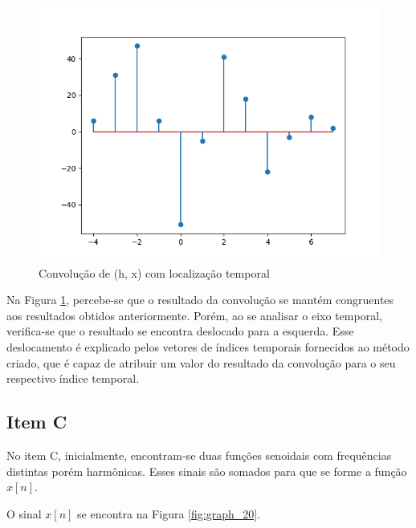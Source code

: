  \begin{figure}[!htb]
    \centering
    \includegraphics[width=\linewidth]{Imagens/fig19.png}
    \caption{Convolução de (h, x) com localização temporal}
    \label{fig:graph_19}
\end{figure}

 Na Figura \ref{fig:graph_19}, percebe-se que o resultado da convolução se mantém congruentes aos resultados obtidos anteriormente. Porém, ao se analisar o eixo temporal, verifica-se que o resultado se encontra deslocado para a esquerda. Esse deslocamento é explicado pelos vetores de índices temporais fornecidos ao método criado, que é capaz de atribuir um valor do resultado da convolução para o seu respectivo índice temporal. 

\subsection{Item C}
No item C, inicialmente, encontram-se duas funções senoidais com frequências distintas porém harmônicas. Esses sinais são somados para que se forme a função $x[n]$. 

O sinal $x[n]$ se encontra na Figura \ref{fig:graph_20}. 

